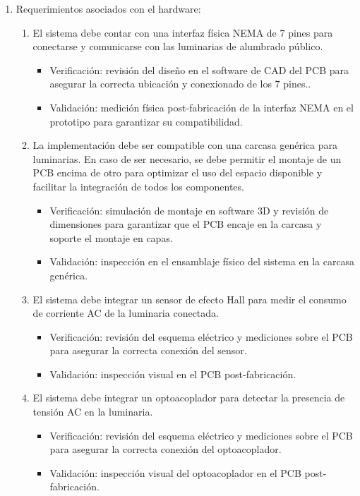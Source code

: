 \documentclass[
11pt, %
]{charter}
\begin{document}
\begin{enumerate}
	\item Requerimientos asociados con el hardware:
		\begin{enumerate}
			\item El sistema debe contar con una interfaz física NEMA de 7 pines para conectarse y comunicarse con las luminarias de alumbrado público.
				  \begin{itemize}
				\item Verificación: revisión del diseño en el software de CAD del PCB para asegurar la correcta ubicación y conexionado de los 7 pines..
				\item Validación:  medición física post-fabricación de la interfaz NEMA en el prototipo para garantizar su compatibilidad.
				\end{itemize}
			\item La implementación debe ser compatible con una carcasa genérica para luminarias. En caso de ser necesario, se debe permitir el montaje de un PCB encima de otro para optimizar el uso del espacio disponible y facilitar la integración de todos los componentes.
				\begin{itemize}
				\item Verificación: simulación de montaje en software 3D y revisión de dimensiones para garantizar que el PCB encaje en la carcasa y 	soporte el montaje en capas.
				\item Validación: inspección en el ensamblaje físico del sistema en la carcasa genérica.
				\end{itemize}
\pagebreak
			\item  El sistema debe integrar un sensor de efecto Hall para medir el consumo de corriente AC de la luminaria conectada.
				\begin{itemize}
				\item Verificación: revisión del esquema eléctrico y mediciones sobre el PCB para asegurar la correcta conexión del sensor.
				\item Validación: inspección visual en el PCB post-fabricación.
				\end{itemize}
			\item El sistema debe integrar un optoacoplador para detectar la presencia de tensión AC en la luminaria.
				\begin{itemize}
				\item Verificación: revisión del esquema eléctrico y mediciones sobre el PCB para asegurar la correcta conexión del optoacoplador.
				\item Validación: inspección visual del optoacoplador en el PCB post-fabricación.

\end{itemize}
\end{enumerate}
\end{enumerate}
\end{document}
